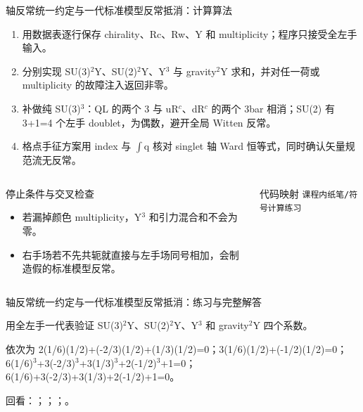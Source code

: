 \begin{frame}[t]{轴反常统一约定与一代标准模型反常抵消：计算算法}
\footnotesize
{}\begin{enumerate}
\item 用数据表逐行保存 chirality、Rc、Rw、Y 和 multiplicity；程序只接受全左手输入。
\item 分别实现 SU(3)\ensuremath{^{2}}Y、SU(2)\ensuremath{^{2}}Y、Y\ensuremath{^{3}} 与 gravity\ensuremath{^{2}}Y 求和，并对任一荷或 multiplicity 的故障注入返回非零。
\item 补做纯 SU(3)\ensuremath{^{3}}：QL 的两个 3 与 uR\ensuremath{^{c}}、dR\ensuremath{^{c}} 的两个 3bar 相消；SU(2) 有 3+1=4 个左手 doublet，为偶数，避开全局 Witten 反常。
\item 格点手征方案用 index 与 \ensuremath{\int}q 核对 singlet 轴 Ward 恒等式，同时确认矢量规范流无反常。
\end{enumerate}\begin{columns}[T,onlytextwidth]
\begin{block}{停止条件与交叉检查}\scriptsize\begin{itemize}
\item[\CheckMark] 若漏掉颜色 multiplicity，Y\ensuremath{^{3}} 和引力混合和不会为零。
\item[\CheckMark] 右手场若不先共轭就直接与左手场同号相加，会制造假的标准模型反常。
\end{itemize}\end{block}
\begin{block}{代码映射}
\scriptsize \texttt{课程内纸笔/\allowbreak{}符号计算练习}
\end{block}\end{columns}\end{frame}

\begin{frame}[t]{轴反常统一约定与一代标准模型反常抵消：练习与完整解答}
\footnotesize
\begin{block}{}用全左手一代表验证 SU(3)\ensuremath{^{2}}Y、SU(2)\ensuremath{^{2}}Y、Y\ensuremath{^{3}} 和 gravity\ensuremath{^{2}}Y 四个系数。\end{block}
\begin{exampleblock}{}依次为 2(1/\allowbreak{}6)(1/\allowbreak{}2)+(-2/\allowbreak{}3)(1/\allowbreak{}2)+(1/\allowbreak{}3)(1/\allowbreak{}2)=0；3(1/\allowbreak{}6)(1/\allowbreak{}2)+(-1/\allowbreak{}2)(1/\allowbreak{}2)=0；6(1/\allowbreak{}6)\ensuremath{^{3}}+3(-2/\allowbreak{}3)\ensuremath{^{3}}+3(1/\allowbreak{}3)\ensuremath{^{3}}+2(-1/\allowbreak{}2)\ensuremath{^{3}}+1=0；6(1/\allowbreak{}6)+3(-2/\allowbreak{}3)+3(1/\allowbreak{}3)+2(-1/\allowbreak{}2)+1=0。\end{exampleblock}
\vfill
\scriptsize 回看：；；；。
\end{frame}

